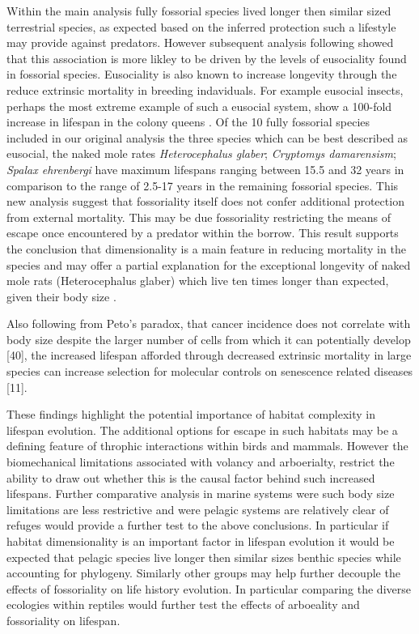 Within the main analysis fully fossorial species lived longer then similar sized terrestrial species, as expected based on the inferred protection such a lifestyle may provide against predators. However subsequent analysis following \cite{williams2015ecology} showed that this association is more likley to be driven by the levels of eusociality found in fossorial species. Eusociality is also known to increase longevity through the reduce extrinsic mortality in breeding indaviduals. For example eusocial insects, perhaps the most extreme example of such a eusocial system, show a 100-fold increase in lifespan in the colony queens \citep{keller1997extraordinary}. Of the 10 fully fossorial species included in our original analysis the three species which can be best described as eusocial, the naked mole rates \textit{Heterocephalus glaber}; \textit{Cryptomys damarensism}; \textit{Spalax ehrenbergi} have maximum lifespans ranging between 15.5 and 32 years in comparison to the range of 2.5-17 years in the remaining fossorial species. This new analysis suggest that fossoriality itself does not confer additional protection from external mortality. This may be due fossoriality restricting the means of escape once encountered by a predator within the borrow. This result supports the conclusion that dimensionality is a main feature in reducing mortality in the species and may offer a  partial explanation for the exceptional longevity of naked mole rats (Heterocephalus glaber) which live ten times longer than expected, given their body size \citep{buffenstein2002naked}.



 Also following from Peto’s paradox, that cancer incidence does not correlate with body size despite the larger number of cells from which it can potentially develop [40], the increased lifespan afforded through decreased extrinsic mortality in large species can increase selection for molecular controls on senescence related diseases [11]. 


These findings highlight the potential importance of habitat complexity in lifespan evolution. The additional options for escape in such habitats may be a defining feature of throphic interactions within birds and mammals. However the biomechanical limitations associated with volancy and arboerialty, restrict the ability to draw out whether this is the causal factor behind such increased lifespans. Further comparative analysis in marine systems were such body size limitations are less restrictive and were pelagic systems are relatively clear of refuges would provide a further test to the above conclusions. In particular if habitat dimensionality is an important factor in lifespan evolution it would be expected that pelagic species live longer then similar sizes benthic species while accounting for phylogeny. Similarly other groups may help further decouple the effects of fossoriality on life history evolution. In particular comparing the diverse ecologies within reptiles would further test the effects of arboeality and fossoriality on lifespan.

